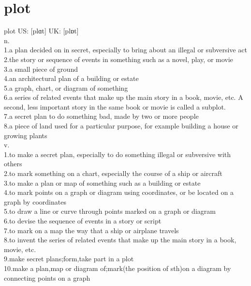 \documentclass[11pt]{article}
\begin{document}
\section{plot}
\label{sec:orgb41e558}
plot US: [plɑt] UK: [plɒt]\\
n.\\
1.a plan decided on in secret, especially to bring about an illegal or subversive act\\
2.the story or sequence of events in something such as a novel, play, or movie\\
3.a small piece of ground\\
4.an architectural plan of a building or estate\\
5.a graph, chart, or diagram of something\\
6.a series of related events that make up the main story in a book, movie, etc. A second, less important story in the same book or movie is called a subplot.\\
7.a secret plan to do something bad, made by two or more people\\
8.a piece of land used for a particular purpose, for example building a house or growing plants\\
v.\\
1.to make a secret plan, especially to do something illegal or subversive with others\\
2.to mark something on a chart, especially the course of a ship or aircraft\\
3.to make a plan or map of something such as a building or estate\\
4.to mark points on a graph or diagram using coordinates, or be located on a graph by coordinates\\
5.to draw a line or curve through points marked on a graph or diagram\\
6.to devise the sequence of events in a story or script\\
7.to mark on a map the way that a ship or airplane travels\\
8.to invent the series of related events that make up the main story in a book, movie, etc.\\
9.make secret plans;form,take part in a plot\\
10.make a plan,map or diagram of;mark(the position of sth)on a diagram by connecting points on a graph\\
\end{document}
